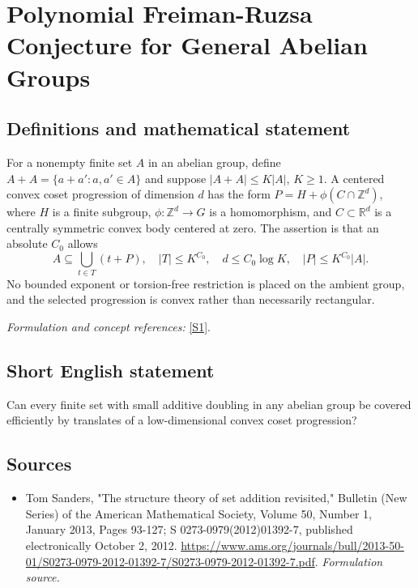 \documentclass[11pt]{article}
\begin{document}
\section*{\texorpdfstring{Polynomial Freiman-Ruzsa Conjecture for General Abelian Groups}{Polynomial Freiman-Ruzsa Conjecture for General Abelian Groups}}\label{30006785}
\subsection{Definitions and mathematical statement}
For a nonempty finite set $A$ in an abelian group, define $A+A=\{a+a':a,a'\in A\}$ and suppose $|A+A|\le K|A|$, $K\ge1$. A centered convex coset progression of dimension $d$ has the form
$P=H+\phi(C\cap{\mathbb{Z}}^d)$, where $H$ is a finite subgroup, $\phi:{\mathbb{Z}}^d\to G$ is a homomorphism, and $C\subset{\mathbb{R}}^d$ is a centrally symmetric convex body centered at zero. The assertion is that an absolute $C_0$ allows
\[
 A\subseteq\bigcup_{t\in T}(t+P),\quad |T|\le K^{C_0},
 \quad d\le C_0\log K,\quad |P|\le K^{C_0}|A|.
\]
No bounded exponent or torsion-free restriction is placed on the ambient group, and the selected progression is convex rather than necessarily rectangular.
\par\smallskip\textit{Formulation and concept references:} \href{https://www.ams.org/journals/bull/2013-50-01/S0273-0979-2012-01392-7/S0273-0979-2012-01392-7.pdf}{[S1]}.

\subsection{Short English statement}
Can every finite set with small additive doubling in any abelian group be covered efficiently by translates of a low-dimensional convex coset progression?
\subsection{Sources}
\begin{itemize}
\item[S1]Tom Sanders, "The structure theory of set addition revisited," Bulletin (New Series) of the American Mathematical Society, Volume 50, Number 1, January 2013, Pages 93-127; S 0273-0979(2012)01392-7, published electronically October 2, 2012.
\url{https://www.ams.org/journals/bull/2013-50-01/S0273-0979-2012-01392-7/S0273-0979-2012-01392-7.pdf}.
\textit{Formulation source.}
\end{itemize}
\end{document}
